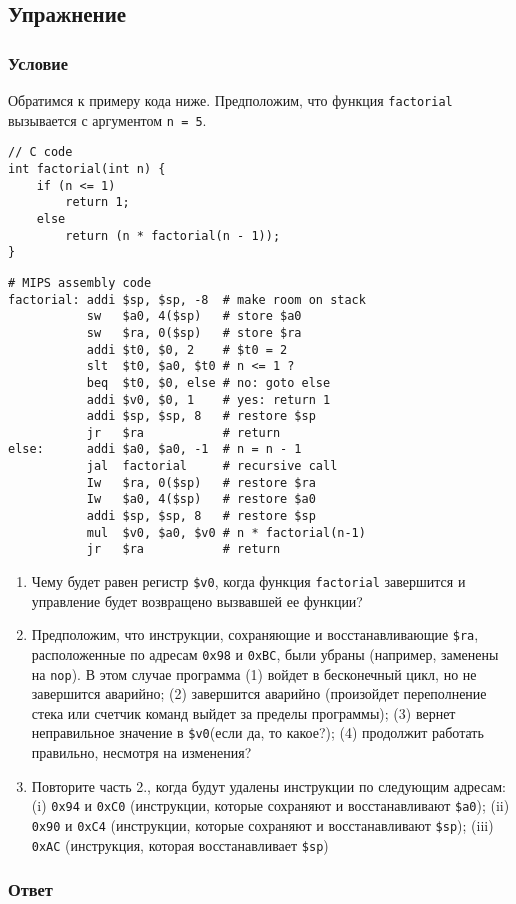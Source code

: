 \documentclass[12pt]{article}
\newenvironment{e}[1][dummy label]{
    \subsection{Упражнение}\label{#1}
    \subsubsection*{Условие}
    }{
    \subsubsection*{Ответ}
}
\begin{document}
    \begin{e}
        Обратимся к примеру кода ниже. Предположим, что функция \texttt{factorial} вызывается с аргументом \texttt{n = 5}.
        \begin{verbatim}
// C code
int factorial(int n) {
    if (n <= 1)
        return 1;
    else
        return (n * factorial(n - 1));
}
        \end{verbatim}
        \begin{verbatim}
# MIPS assembly code
factorial: addi $sp, $sp, -8  # make room on stack
           sw   $a0, 4($sp)   # store $a0
           sw   $ra, 0($sp)   # store $ra
           addi $t0, $0, 2    # $t0 = 2
           slt  $t0, $a0, $t0 # n <= 1 ?
           beq  $t0, $0, else # no: goto else
           addi $v0, $0, 1    # yes: return 1
           addi $sp, $sp, 8   # restore $sp
           jr   $ra           # return
else:      addi $a0, $a0, -1  # n = n - 1
           jal  factorial     # recursive call
           Iw   $ra, 0($sp)   # restore $ra
           Iw   $a0, 4($sp)   # restore $a0
           addi $sp, $sp, 8   # restore $sp
           mul  $v0, $a0, $v0 # n * factorial(n-1)
           jr   $ra           # return
        \end{verbatim}

        \newpage

        \begin{enumerate}
            \item Чему будет равен регистр \texttt{\$v0}, когда функция \texttt{factorial} завершится и управление будет возвращено вызвавшей ее функции?
            \item Предположим, что инструкции, сохраняющие и восстанавливающие \texttt{\$ra}, расположенные по адресам \texttt{0x98} и \texttt{0xBC}, были убраны (например, заменены на \texttt{nop}). В этом случае программа (1) войдет в бесконечный цикл, но не завершится аварийно; (2) завершится аварийно (произойдет переполнение стека или счетчик команд выйдет за пределы программы); (3) вернет неправильное значение в \texttt{\$v0}(если да, то какое?); (4) продолжит работать правильно, несмотря на изменения?
            \item Повторите часть 2., когда будут удалены инструкции по следующим адресам: (i) \texttt{0x94} и \texttt{0xC0} (инструкции, которые сохраняют и восстанавливают \texttt{\$а0}); (ii) \texttt{0x90} и \texttt{0xC4} (инструкции, которые сохраняют и восстанавливают \texttt{\$sp}); (iii) \texttt{0xAC} (инструкция, которая восстанавливает \texttt{\$sp})
        \end{enumerate}
    \end{e}
\end{document}
